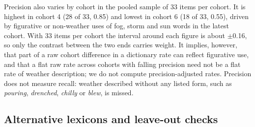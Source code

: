\documentclass[11pt]{article}
\begin{document}
Precision also varies by cohort in the pooled sample of 33 items per cohort. It is highest in cohort 4 (28 of 33, 0.85) and lowest in cohort 6 (18 of 33, 0.55), driven by figurative or non-weather uses of fog, storm and sun words in the latest cohort.
With 33 items per cohort the interval around each figure is about $\pm$0.16, so only the contrast between the two ends carries weight. It implies, however, that part of a raw cohort difference in a dictionary rate can reflect figurative use, and that a flat raw rate across cohorts with falling precision need not be a flat rate of weather description; we do not compute precision-adjusted rates. Precision does not measure recall: weather described without any listed form, such as \emph{pouring}, \emph{drenched}, \emph{chilly} or \emph{blew}, is missed.

\subsection{Alternative lexicons and leave-out checks}
\end{document}
